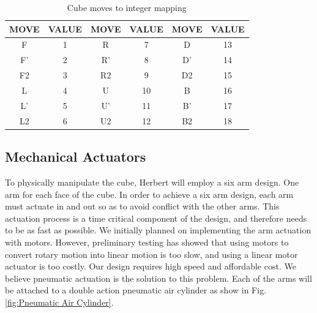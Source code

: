 \documentclass[final, letterpaper, 10 pt, conference, onecolumn]{IEEEtran}
\begin{document}
\begin{table}[!ht]
\caption{Cube moves to integer mapping}
\label{table:moves table}
\centering
\begin{tabular}{|c|c|c|c|c|c|}
\hline
\textbf{MOVE} & \textbf{VALUE} & \textbf{MOVE} & \textbf{VALUE} & \textbf{MOVE} & \textbf{VALUE} \\ \hline
F             & 1              & R             & 7              & D             & 13             \\ \hline
F'            & 2              & R'            & 8              & D'            & 14             \\ \hline
F2            & 3              & R2            & 9              & D2            & 15             \\ \hline
L             & 4              & U             & 10             & B             & 16             \\ \hline
L'            & 5              & U'            & 11             & B'            & 17             \\ \hline
L2            & 6              & U2            & 12             & B2            & 18             \\ \hline
\end{tabular}
\end{table}

\subsection{Mechanical Actuators}
\label{sec:Mechanical Actuators}
To physically manipulate the cube, Herbert will employ a six arm design. One arm for each face of the cube. In order to achieve a six arm design, each arm must actuate in and out so as to avoid conflict
with the other arms. This actuation process is a time critical component of
the design, and therefore needs to be as fast as possible.  We initially planned on implementing the
arm actuation with motors.  However, preliminary testing has showed that using
motors to convert rotary motion into linear motion is too slow, and using a linear motor
actuator is too costly. Our design requires high speed and affordable cost. We believe pneumatic actuation is the solution to this problem.  Each of the arms will be attached to a double action pneumatic air cylinder as show in Fig. \ref{fig:Pneumatic Air Cylinder}.
\end{document}
